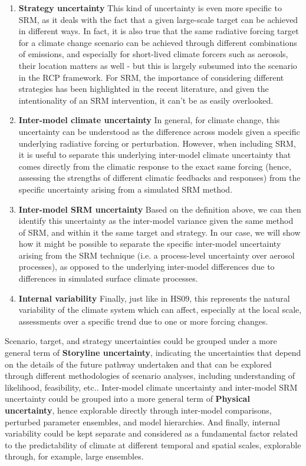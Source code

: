 \documentclass[acp, manuscript]{copernicus}
\begin{document}
\begin{enumerate}
    \item \textbf{Strategy uncertainty} This kind of uncertainty is even more specific to SRM, as it deals with the fact that a given large-scale target can be achieved in different ways. In fact, it is also true that the same radiative forcing target for a climate change scenario can be achieved through different combinations of emissions, and especially for short-lived climate forcers such as aerosols, their location matters as well - but this is largely subsumed into the scenario in the RCP framework. For SRM, the importance of considering different strategies has been highlighted in the recent literature, and given the intentionality of an SRM intervention, it can't be as easily overlooked.

    \item \textbf{Inter-model climate uncertainty} In general, for climate change, this uncertainty can be understood as the difference across models given a specific underlying radiative forcing or perturbation. However, when including SRM, it is useful to separate this underlying inter-model climate uncertainty that comes directly from the climatic response to the exact same forcing (hence, assessing the strengths of different climatic feedbacks and responses) from the specific uncertainty arising from a simulated SRM method. 
        
    \item \textbf{Inter-model SRM uncertainty} Based on the definition above, we can then identify this uncertainty as the inter-model variance given the same method of SRM, and within it the same target and strategy. In our case, we will show how it might be possible to separate the specific inter-model uncertainty arising from the SRM technique (i.e. a process-level uncertainty over aerosol processes), as opposed to the underlying inter-model differences due to differences in simulated surface climate processes.
    
    \item \textbf{Internal variability} Finally, just like in HS09, this represents the natural variability of the climate system which can affect, especially at the local scale, assessments over a specific trend due to one or more forcing changes.
    
\end{enumerate}

Scenario, target, and strategy uncertainties could be grouped under a more general term of \textbf{Storyline uncertainty}, indicating the uncertainties that depend on the details of the future pathway undertaken and that can be explored through different methodologies of scenario analyses, including understanding of likelihood, feasibility, etc.. Inter-model climate uncertainty and inter-model SRM uncertainty could be grouped into a more general term of \textbf{Physical uncertainty}, hence explorable directly through inter-model comparisons, perturbed parameter ensembles, and model hierarchies. And finally, internal variability could be kept separate and considered as a fundamental factor related to the predictability of climate at different temporal and spatial scales, explorable through, for example, large ensembles.
\end{document}
